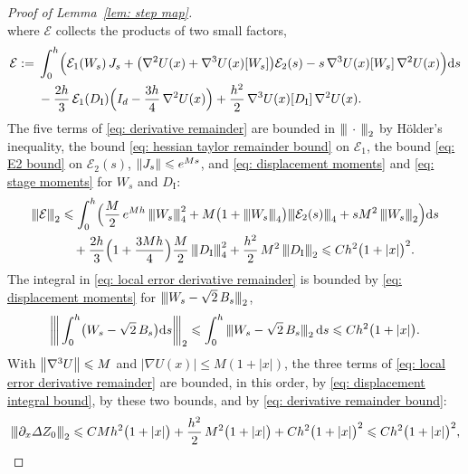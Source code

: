 \documentclass[namedate,webpdf,imanum]{ima-authoring-template}
\newcommand{\pnorm}[1]{{\vert\kern-0.25ex\vert\kern-0.25ex\vert} #1 {\vert\kern-0.25ex\vert\kern-0.25ex\vert}}
\newcommand{\triline}[1][]{#1\vert\kern-0.25ex#1\vert\kern-0.25ex#1\vert}
\newcommand{\Le}{\leqslant}
\newcommand{\D}{\mathrm{d}}
\theoremstyle{thmstyletwo}
\numberwithin{equation}{section}
\begin{document}
\begin{proof}[Proof of Lemma~\ref{lem: step map}]
\begin{equation}
        \label{eq: local error derivative remainder}
    \end{equation}
    where $\mathcal E$ collects the products of two small factors,
    \begin{align}
        \mathcal E := {} & \int_0^h \Bigl( \mathcal E_1(W_s)\, J_s + \bigl( \nabla^2 U(x) + \nabla^3 U(x)[W_s] \bigr) \mathcal E_2(s) - s\, \nabla^3 U(x)[W_s]\, \nabla^2 U(x) \Bigr) \D s \notag \\
        & - \frac{2h}{3}\, \mathcal E_1(D_{\mathrm I}) \Bigl( I_d - \frac{3h}{4}\, \nabla^2 U(x) \Bigr) + \frac{h^2}{2}\, \nabla^3 U(x)[D_{\mathrm I}]\, \nabla^2 U(x) .
        \label{eq: derivative remainder}
    \end{align}
    The five terms of \eqref{eq: derivative remainder} are bounded in $\pnorm{\,\cdot\,}_2$ by H\"older's inequality, the bound \eqref{eq: hessian taylor remainder bound} on $\mathcal E_1$, the bound \eqref{eq: E2 bound} on $\mathcal E_2(s)$, $\norm{J_s} \Le e^{Ms}$, and \eqref{eq: displacement moments} and \eqref{eq: stage moments} for $W_s$ and $D_{\mathrm I}$:
    \begin{align}
        \pnorm{\mathcal E}_2 & \Le \int_0^h \Bigl( \frac M2\, e^{Mh}\, \pnorm{W_s}_4^2 + M \bigl( 1 + \pnorm{W_s}_4 \bigr) \pnorm{\mathcal E_2(s)}_4 + s M^2\, \pnorm{W_s}_2 \Bigr) \D s \notag \\
        & \quad + \frac{2h}{3} \Bigl( 1 + \frac{3 M h}{4} \Bigr) \frac M2\, \pnorm{D_{\mathrm I}}_4^2 + \frac{h^2}{2}\, M^2\, \pnorm{D_{\mathrm I}}_2
        \Le C h^2 \bigl( 1 + |x| \bigr)^2 .
        \label{eq: derivative remainder bound}
    \end{align}
    The integral in \eqref{eq: local error derivative remainder} is bounded by \eqref{eq: displacement moments} for $\pnorm{W_s - \sqrt2\, B_s}_2$,
    \begin{equation}
        \triline[\bigg] \int_0^h \bigl( W_s - \sqrt2\, B_s \bigr) \D s \triline[\bigg]_2 \Le \int_0^h \pnorm{W_s - \sqrt2\, B_s}_2\,\D s \Le C h^2 \bigl( 1 + |x| \bigr) .
        \label{eq: displacement integral bound}
    \end{equation}
    With $\norm{\nabla^3 U} \Le M$ and $|\nabla U(x)| \Le M (1 + |x|)$, the three terms of \eqref{eq: local error derivative remainder} are bounded, in this order, by \eqref{eq: displacement integral bound}, by these two bounds, and by \eqref{eq: derivative remainder bound}:
    \begin{equation*}
        \pnorm{\partial_x \Delta Z_0}_2 \Le C M h^2 \bigl( 1 + |x| \bigr) + \frac{h^2}{2}\, M^2 \bigl( 1 + |x| \bigr) + C h^2 \bigl( 1 + |x| \bigr)^2 \Le C h^2 \bigl( 1 + |x| \bigr)^2 ,

\end{equation*}
\end{proof}
\end{document}
